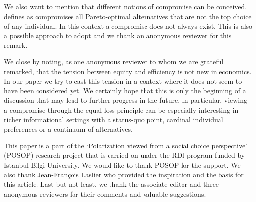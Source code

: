 We also want to mention that different notions of compromise can be conceived. \citet{Borgers1991} defines as compromises all Pareto-optimal alternatives that are not the top choice of any individual. In this context a compromise does not always exist. This is also a possible approach to adopt and we thank an anonymous reviewer for this remark.

We close by noting, as one anonymous reviewer to whom we are grateful remarked, that the tension between equity and efficiency is not new in economics. In our paper we try to cast this tension in a context where it does not seem to have been considered yet. We certainly hope that this is only the beginning of a discussion that may lead to further progress in the future. In particular, viewing a compromise through the equal loss principle can be especially interesting in richer informational settings with a status-quo point, cardinal individual preferences or a continuum of alternatives.

\begin{acknowledgements}
	This paper is a part of the ‘Polarization viewed from a social choice perspective’ (POSOP) research project that is carried on under the RDI program funded by Istanbul Bilgi University. We would like to thank POSOP  for the support. We also thank Jean-François Laslier who provided the inspiration and the basis for this article. Last but not least, we thank the associate editor and three anonymous reviewers for their comments and valuable suggestions.  
\end{acknowledgements}

